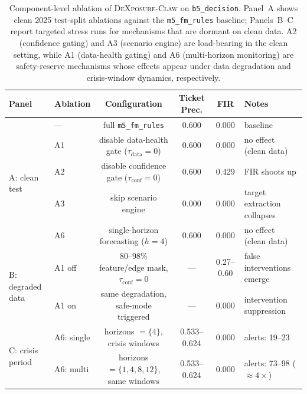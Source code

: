 \begin{table}[t]
\centering
\footnotesize
\setlength{\tabcolsep}{4pt}
\caption{Component-level ablation of \textsc{DeXposure-Claw} on
\texttt{b5\_decision}. Panel~A shows clean 2025 test-split ablations against
the \texttt{m5\_fm\_rules} baseline; Panels~B--C report targeted stress runs
for mechanisms that are dormant on clean data. A2 (confidence gating) and A3
(scenario engine) are load-bearing in the clean setting, while A1
(data-health gating) and A6 (multi-horizon monitoring) are safety-reserve
mechanisms whose effects appear under data degradation and crisis-window
dynamics, respectively.}
\label{tab:ablation}
\begin{tabular}{l l c c c l}
\toprule
Panel & Ablation & Configuration & Ticket Prec. & FIR & Notes \\
\midrule
\multirow{5}{*}{A: clean test}
 & ---  & full \texttt{m5\_fm\_rules}                                       & 0.600 & 0.000 & baseline \\
 & A1   & disable data-health gate ($\tau_{\mathrm{data}}{=}0$)             & 0.600 & 0.000 & no effect (clean data) \\
 & A2   & disable confidence gate ($\tau_{\mathrm{conf}}{=}0$)              & 0.600 & 0.429 & FIR shoots up \\
 & A3   & skip scenario engine                                              & 0.000 & 0.000 & target extraction collapses \\
 & A6   & single-horizon forecasting ($h{=}4$)                              & 0.600 & 0.000 & no effect (clean data) \\
\midrule
\multirow{2}{*}{B: degraded data}
 & A1 off & 80--98\% feature/edge mask, $\tau_{\mathrm{conf}}{=}0$          & ---   & 0.27--0.60 & false interventions emerge \\
 & A1 on  & same degradation, safe-mode triggered                           & ---   & 0.000      & intervention suppression \\
\midrule
\multirow{2}{*}{C: crisis period}
 & A6: single & horizons $=\{4\}$, crisis windows                         & 0.533--0.624 & 0.000 & alerts: 19--23 \\
 & A6: multi  & horizons $=\{1,4,8,12\}$, same windows                    & 0.533--0.624 & 0.000 & alerts: 73--98 ($\approx4\times$) \\
\bottomrule
\end{tabular}
\end{table}
